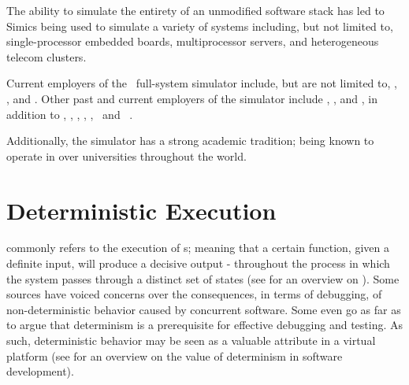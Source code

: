 \noindent
The ability to simulate the entirety of an unmodified software stack has led to Simics being used to simulate a variety of systems including, but not limited to, single-processor embedded boards, multiprocessor servers, and heterogeneous telecom clusters.

Current employers of the \dvttermsimics\ full-system simulator include, but are not limited to, \dvttermibm {}, \dvttermnasa {}, and \dvttermintel {}.
Other past and current employers of the simulator include \dvttermsunmicrosystems , \dvttermericsson , and \dvttermhewlettpackard {}, in addition to \dvttermcisco , \dvttermfreescalesemiconductor , \dvttermgeavionics , \dvttermhoneywell , \dvttermlockheedmartin , \dvttermnortel\ and \dvttermnorthropgrumman\ .

Additionally, the simulator has a strong academic tradition; being known to operate in over  universities throughout the world.


\section{Deterministic Execution}
\label{sec:background_deterministicexecution}
 commonly refers to the execution of \dvttermdeterministicalgorithm s; meaning that a certain function, given a definite input, will produce a decisive output - throughout the process in which the system passes through a distinct set of states (see  for an overview on ).
Some sources have voiced concerns over the consequences, in terms of debugging, of non-deterministic behavior caused by concurrent software.
Some even go as far as to argue that determinism is a prerequisite for effective debugging and testing.
As such, deterministic behavior may be seen as a valuable attribute in a virtual platform (see  for an overview on the value of determinism in software development).

